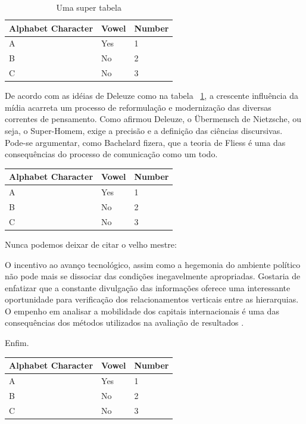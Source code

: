 \documentclass[font=plain,chapter=TITLE,section=Title,espaco=duplo,tocpage=plain,appendix=Name,floatnumber=continuous]{abnt}
\begin{document}
\begin{table}[h!b!p!]
\centering
\begin{tabular}{lll}
\hline
Alphabet Character & Vowel & Number \\
\hline
A & Yes & 1 \\
B & No & 2 \\
C & No & 3 \\
\hline
\end{tabular}
\caption{Uma super tabela}
\label{tab:seila}
\end{table}

De acordo com as idéias de Deleuze como na tabela ~\ref{tab:seila}, a crescente
influência da mídia acarreta um processo de reformulação e modernização das
diversas correntes de pensamento.  Como afirmou Deleuze, o Übermensch de
Nietzsche, ou seja, o Super-Homem, exige a precisão e a definição das ciências
discursivas.  Pode-se argumentar, como Bachelard fizera, que a teoria de Fliess
é uma das consequências do processo de comunicação como um todo.

\begin{table}[h!b!p!]
\centering
\begin{tabular}{lll}
\hline
Alphabet Character & Vowel & Number \\
\hline
A & Yes & 1 \\
B & No & 2 \\
C & No & 3 \\
\hline
\end{tabular}
\label{quadro:outrola}
\end{table}

Nunca podemos deixar de citar o velho mestre:

\begin{citacao}
O incentivo ao avanço tecnológico, assim como a hegemonia do ambiente
político não pode mais se dissociar das condições inegavelmente
apropriadas. Gostaria de enfatizar que a constante divulgação das
informações oferece uma interessante oportunidade para verificação dos
relacionamentos verticais entre as hierarquias. O empenho em analisar a
mobilidade dos capitais internacionais é uma das consequências dos métodos
utilizados na avaliação de resultados \cite{semolini2002support}.
\end{citacao}

Enfim.

\begin{table}
\centering
\begin{tabular}{lll}
\hline
Alphabet Character & Vowel & Number \\
\hline
A & Yes & 1 \\
B & No & 2 \\
C & No & 3 \\
\hline
\end{tabular}
\end{table}
\end{document}
